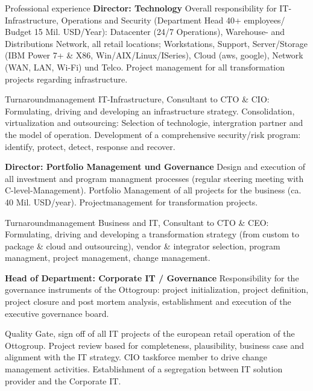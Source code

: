 \begin{rubric}{Professional experience}
\entry*[04/2013 - today] \textbf{Director: Technology}\newline
{} 
Overall responsibility for IT-Infrastructure, Operations and Security (Department Head 40+ employees/ Budget 15 Mil. USD/Year): Datacenter (24/7 Operations), Warehouse- and Distributions Network, all retail locations; Workstations, Support, Server/Storage (IBM Power 7+ \& X86, Win/AIX/Linux/ISeries), Cloud (aws, google), Network (WAN, LAN, Wi-Fi) und Telco. Project management for all transformation projects regarding infrastructure.

Turnaroundmanagement IT-Infrastructure, Consultant to CTO \& CIO: Formulating, driving and developing an infrastructure strategy. Consolidation, virtualization and outsourcing: Selection of technologie, intergration partner and the model of operation. Development of a comprehensive security/risk program: identify, protect, detect, response and recover.

\entry*[10/2011 - 03/2013] \textbf{Director: Portfolio Management und Governance}\newline
{} 
Design and execution of all investment and program managment processes (regular steering meeting with C-level-Management). Portfolio Management of all projects for the business (ca. 40 Mil. USD/year). Projectmanagement for transformation projects.\axelvspace

Turnaroundmanagement Business and IT, Consultant to CTO \& CEO: Formulating, driving and developing a transformation strategy (from custom to package \& cloud and outsourcing), vendor \& integrator selection, program managment, project management, change management.\newline

\pagebreak
{}
\entry*[08/2009 - 10/2011] \textbf{Head of Department: Corporate IT / Governance}\newline
{} 
Responsibility for the governance instruments of the Ottogroup: project initialization, project definition, project closure and post mortem analysis, establishment and execution of the executive governance board.\axelvspace

Quality Gate, sign off of all IT projects of the european retail operation of the Ottogroup. Project review based for completeness, plausibility, business case and alignment with the IT strategy. CIO taskforce member to drive change management activities. Establishment of a segregation between IT solution provider and the Corporate IT.


\end{rubric}
